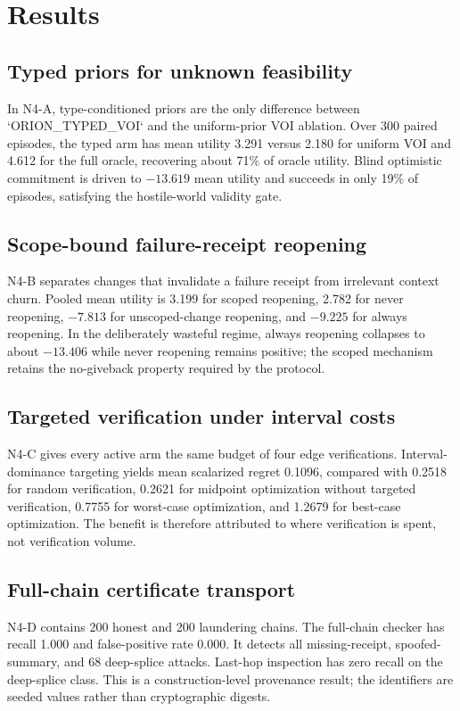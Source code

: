 \section{Results}

\subsection{Typed priors for unknown feasibility}
In N4-A, type-conditioned priors are the only difference between `ORION_TYPED_VOI` and the uniform-prior VOI ablation. Over 300 paired episodes, the typed arm has mean utility 3.291 versus 2.180 for uniform VOI and 4.612 for the full oracle, recovering about 71\% of oracle utility. Blind optimistic commitment is driven to $-13.619$ mean utility and succeeds in only 19\% of episodes, satisfying the hostile-world validity gate.

\subsection{Scope-bound failure-receipt reopening}
N4-B separates changes that invalidate a failure receipt from irrelevant context churn. Pooled mean utility is 3.199 for scoped reopening, 2.782 for never reopening, $-7.813$ for unscoped-change reopening, and $-9.225$ for always reopening. In the deliberately wasteful regime, always reopening collapses to about $-13.406$ while never reopening remains positive; the scoped mechanism retains the no-giveback property required by the protocol.

\subsection{Targeted verification under interval costs}
N4-C gives every active arm the same budget of four edge verifications. Interval-dominance targeting yields mean scalarized regret 0.1096, compared with 0.2518 for random verification, 0.2621 for midpoint optimization without targeted verification, 0.7755 for worst-case optimization, and 1.2679 for best-case optimization. The benefit is therefore attributed to where verification is spent, not verification volume.

\subsection{Full-chain certificate transport}
N4-D contains 200 honest and 200 laundering chains. The full-chain checker has recall 1.000 and false-positive rate 0.000. It detects all missing-receipt, spoofed-summary, and 68 deep-splice attacks. Last-hop inspection has zero recall on the deep-splice class. This is a construction-level provenance result; the identifiers are seeded values rather than cryptographic digests.

